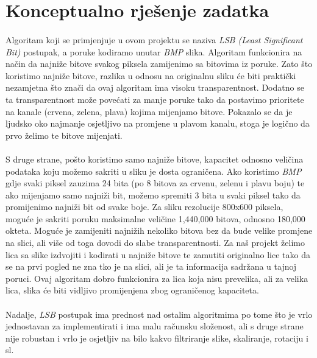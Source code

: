\documentclass[times, utf8, seminar]{fer}
\begin{document}
\section{Konceptualno rješenje zadatka}
\paragraph{}
Algoritam koji se primjenjuje u ovom projektu se naziva \textit{LSB (Least Significant Bit)} postupak, a poruke kodiramo unutar \textit{BMP} slika. Algoritam funkcionira na način da najniže bitove svakog piksela zamijenimo sa bitovima iz poruke. Zato što koristimo najniže bitove, razlika u odnosu na originalnu sliku će biti praktički nezamjetna što znači da ovaj algoritam ima visoku transparentnost. Dodatno se ta transparentnost može povećati za manje poruke tako da postavimo prioritete na kanale (crvena, zelena, plava) kojima mijenjamo bitove. Pokazalo se da je ljudsko oko najmanje osjetljivo na promjene u plavom kanalu, stoga je logično da prvo želimo te bitove mijenjati.
\paragraph{}
S druge strane, pošto koristimo samo najniže bitove, kapacitet odnosno veličina podataka koju možemo sakriti u sliku je dosta ograničena. Ako koristimo \textit{BMP} gdje svaki piksel zauzima 24 bita (po 8 bitova za crvenu, zelenu i plavu boju) te ako  mijenjamo samo najniži bit, možemo spremiti 3 bita u svaki piksel tako da promijenimo najniži bit od svake  boje. Za sliku rezolucije 800x600 piksela, moguće je sakriti poruku maksimalne veličine 1,440,000 bitova, odnosno 180,000 okteta. Moguće je zamijeniti najnižih nekoliko bitova bez da bude velike promjene na slici, ali više od toga dovodi do slabe transparentnosti. Za naš projekt želimo lica sa slike izdvojiti i kodirati u najniže bitove te zamutiti originalno lice tako da se na prvi pogled ne zna tko je na slici, ali je ta informacija sadržana u tajnoj poruci. Ovaj algoritam dobro funkcionira za lica koja nisu prevelika, ali za velika lica, slika će biti vidljivo promijenjena zbog ograničenog kapaciteta.
\paragraph{}
Nadalje, \textit{LSB} postupak ima prednost nad ostalim algoritmima po tome što je vrlo jednostavan za implementirati i ima malu računsku složenost, ali s druge strane nije robustan i vrlo je osjetljiv na bilo kakvo filtriranje slike, skaliranje, rotaciju i sl. 
\end{document}

